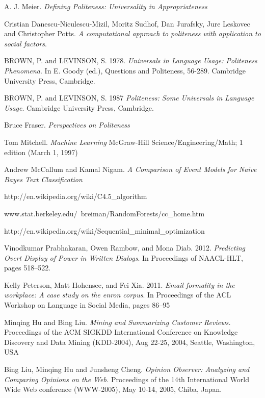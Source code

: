 \documentclass[conference]{IEEEtran}
\begin{document}
\begin{thebibliography}{1}

A. J. Meier. \textit{Defining Politeness: Universality in Appropriateness}

Cristian Danescu-Niculescu-Mizil, Moritz Sudhof, Dan Jurafsky, Jure Leskovec and Christopher Potts. \textit{A computational approach to politeness with application to social factors}.

BROWN, P. and LEVINSON, S. 1978. \textit{Universals in Language Usage: Politeness Phenomena}. In E. Goody (ed.), Questions and Politeness, 56-289. Cambridge University Press, Cambridge.

BROWN, P. and LEVINSON, S. 1987 \textit{Politeness: Some Universals in Language Usage}. Cambridge University Press, Cambridge.

Bruce Fraser. \textit{Perspectives on Politeness}

Tom Mitchell. \textit{Machine Learning} McGraw-Hill Science/Engineering/Math; 1 edition (March 1, 1997)

Andrew McCallum and Kamal Nigam. \textit{A Comparison of Event Models for Naive Bayes Text Classification}

http://en.wikipedia.org/wiki/C4.5\_algorithm

www.stat.berkeley.edu/~breiman/RandomForests/cc\_home.htm

http://en.wikipedia.org/wiki/Sequential\_minimal\_optimization

\bibitem{}
Vinodkumar Prabhakaran, Owen Rambow, and Mona Diab. 2012. \textit{Predicting Overt Display of Power in Written Dialogs}. In Proceedings of NAACL-HLT, pages 518–522.

\bibitem{}
Kelly Peterson, Matt Hohensee, and Fei Xia. 2011. \textit{Email formality in the workplace: A case study on the enron corpus}. In Proceedings of the ACL Workshop on Language in Social Media, pages 86–95

\bibitem{}
Minqing Hu and Bing Liu. \textit{Mining and Summarizing Customer Reviews.} Proceedings of the ACM SIGKDD International Conference on Knowledge Discovery and Data Mining (KDD-2004), Aug 22-25, 2004, Seattle, Washington, USA

\bibitem{}
Bing Liu, Minqing Hu and Junsheng Cheng. \textit{Opinion Observer: Analyzing and Comparing Opinions on the Web.} Proceedings of the 14th International World Wide Web conference (WWW-2005), May 10-14, 2005, Chiba, Japan.

\end{thebibliography}



\end{document}
